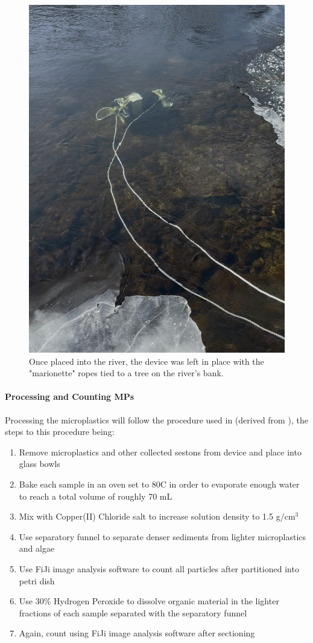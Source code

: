 \documentclass[fleqn,10pt]{SelfArx} %
\begin{document}
	\begin{figure}[h]
		\centering
		\includegraphics[width=0.75\linewidth]{Figures/DeviceDeployed}
		\caption[Device Deployed into River]{Once placed into the river, the device was left in place with the "marionette" ropes tied to a tree on the river's bank.}
		\label{fig:DeployedDevice}
	\end{figure}
	
	
	
	
	
	
	\paragraph*{Processing and Counting MPs}
	\label{sec:processing}
	Processing the microplastics will follow the procedure used in \cite{LenakerEtAlvertdist}(derived from \cite{Zobkov_Esiukova_2016}), the steps to this procedure being:
	\begin{enumerate}
		\item Remove microplastics and other collected \glspl{seston} from device and place into glass bowls 
		\item Bake each sample in an oven set to 80\textdegree C in order to evaporate enough water to reach a total volume of roughly 70 mL
		\item Mix with Copper(II) Chloride salt to increase solution density to 1.5 g/cm$^3$  
		\item Use separatory funnel to separate denser sediments from lighter microplastics and algae
		\item Use FiJi image analysis software to count all particles after partitioned into petri dish
		\item Use 30\% Hydrogen Peroxide to dissolve organic material in the lighter fractions of each sample separated with the separatory funnel
		\item Again, count using FiJi image analysis software after sectioning
	\end{enumerate}
\end{document}
